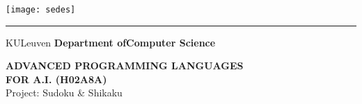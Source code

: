 \begin{titlepage}
    \newpage
    \thispagestyle{empty}
    \frenchspacing
    \hspace{-0.2cm}
    \texttt{[image: sedes]}
    \hspace{0.2cm}
    \rule{0.5pt}{3.4cm}
    \hspace{0.2cm}
    \begin{minipage}[b]{8cm}
        \Large{KULeuven}\smallskip\newline
        \large{}\smallskip\newline
        \textbf{Department of\newline Computer Science}\smallskip
    \end{minipage}
    \vspace*{3.2cm}\vfill
    \begin{center}
        \begin{minipage}[t]{\textwidth}
            \begin{center}
                \LARGE{\rm{\textbf{\uppercase{Advanced Programming Languages \\ for A.I. (H02A8a)}}}}\\
                \Large{\rm{Project: Sudoku \& Shikaku}}
            \end{center}
        \end{minipage}
    \end{center}
    \vfill
    \hfill{}
\end{titlepage}
